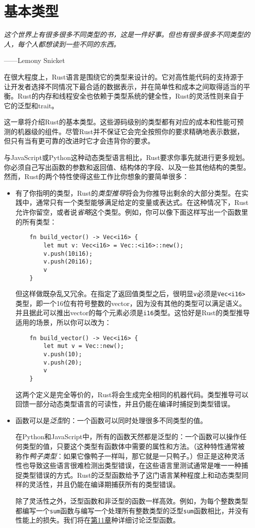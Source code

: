 \chapter{基本类型}\label{ch03}
\emph{这个世界上有很多很多不同类型的书，这是一件好事。但也有很多很多不同类型的人，每个人都想读到一些不同的东西。}
\begin{flushright}
    ——Lemony Snicket
\end{flushright}

在很大程度上，Rust语言是围绕它的类型来设计的。它对高性能代码的支持源于让开发者选择不同情况下最合适的数据表示，并在简单性和成本之间取得适当的平衡。Rust的内存和线程安全也依赖于类型系统的健全性，Rust的灵活性则来自于它的泛型和trait。

这一章将介绍Rust的基本类型。这些源码级别的类型都有对应的成本和性能可预测的机器级的组件。尽管Rust并不保证它会完全按照你的要求精确地表示数据，但只有当有更可靠的改进时它才会违背你的要求。

与JavaScript或Python这种动态类型语言相比，Rust要求你事先就进行更多规划。你必须自己写出函数的参数和返回值、结构体的字段、以及一些其他结构的类型。然而，Rust的两个特性使得这些工作比你想象的要简单很多：

\begin{itemize}
    \item 有了你指明的类型，Rust的\emph{类型推导}将会为你推导出剩余的大部分类型。在实践中，通常只有一个类型能够满足给定的变量或表达式。在这种情况下，Rust允许你留空，或者说\emph{省略}这个类型。例如，你可以像下面这样写出一个函数里的所有类型：
    \begin{verbatim}
    fn build_vector() -> Vec<i16> {
        let mut v: Vec<i16> = Vec::<i16>::new();
        v.push(10i16);
        v.push(20i16);
        v
    }
    \end{verbatim}
    但这样做既杂乱又冗余。在指定了返回值类型之后，很明显\texttt{v}必须是\texttt{Vec<i16>}类型，即一个16位有符号整数的vector，因为没有其他的类型可以满足语义。并且据此可以推出vector的每个元素必须是\texttt{i16}类型。这恰好是Rust的类型推导适用的场景，所以你可以改为：
    \begin{verbatim}
    fn build_vector() -> Vec<i16> {
        let mut v = Vec::new();
        v.push(10);
        v.push(20);
        v
    }
    \end{verbatim}
    这两个定义是完全等价的，Rust将会生成完全相同的机器代码。类型推导可以回馈一部分动态类型语言的可读性，并且仍能在编译时捕捉到类型错误。
    \item 函数可以是\emph{泛型}的：一个函数可以同时处理很多不同类型的值。

    在Python和JavaScript中，所有的函数天然都是泛型的：一个函数可以操作任何类型的值，只要这个类型有函数体中需要的属性和方法。（这种特性通常被称作\emph{鸭子类型}：如果它像鸭子一样叫，那它就是一只鸭子。）但正是这种灵活性也导致这些语言很难检测出类型错误，在这些语言里测试通常是唯一一种捕捉类型错误的方式。Rust的泛型函数给予了这门语言某种程度上和动态类型同样的灵活性，并且仍能在编译期捕获所有的类型错误。

    除了灵活性之外，泛型函数和非泛型的函数一样高效。例如，为每个整数类型都编写一个\texttt{sum}函数与编写一个处理所有整数类型的泛型\texttt{sum}函数相比，并没有性能上的损失。我们将在\hyperref[ch11]{第11章}种详细讨论泛型函数。
\end{itemize}

